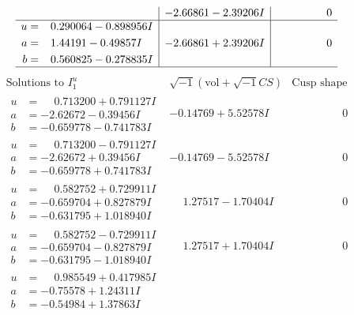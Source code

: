 \documentclass[1p]{elsarticle_modified}
\theoremstyle{definition}
\newcommand{\I}{\sqrt{-1}}
\begin{document}
$$\begin{array}{c|c|c}
 & -2.66861 - 2.39206 I & \phantom{-0.000000 } 0 \\ \hline\begin{aligned}
u &= \phantom{-}0.290064 - 0.898956 I \\
a &= \phantom{-}1.44191 - 0.49857 I \\
b &= \phantom{-}0.560825 - 0.278835 I\end{aligned}
 & -2.66861 + 2.39206 I & \phantom{-0.000000 } 0\\
 \hline 
 \end{array}$$\newpage$$\begin{array}{c|c|c}  
\text{Solutions to }I^u_{1}& \I (\text{vol} + \sqrt{-1}CS) & \text{Cusp shape}\\
 \hline 
\begin{aligned}
u &= \phantom{-}0.713200 + 0.791127 I \\
a &= -2.62672 - 0.39456 I \\
b &= -0.659778 - 0.741783 I\end{aligned}
 & -0.14769 + 5.52578 I & \phantom{-0.000000 } 0 \\ \hline\begin{aligned}
u &= \phantom{-}0.713200 - 0.791127 I \\
a &= -2.62672 + 0.39456 I \\
b &= -0.659778 + 0.741783 I\end{aligned}
 & -0.14769 - 5.52578 I & \phantom{-0.000000 } 0 \\ \hline\begin{aligned}
u &= \phantom{-}0.582752 + 0.729911 I \\
a &= -0.659704 + 0.827879 I \\
b &= -0.631795 + 1.018940 I\end{aligned}
 & \phantom{-}1.27517 - 1.70404 I & \phantom{-0.000000 } 0 \\ \hline\begin{aligned}
u &= \phantom{-}0.582752 - 0.729911 I \\
a &= -0.659704 - 0.827879 I \\
b &= -0.631795 - 1.018940 I\end{aligned}
 & \phantom{-}1.27517 + 1.70404 I & \phantom{-0.000000 } 0 \\ \hline\begin{aligned}
u &= \phantom{-}0.985549 + 0.417985 I \\
a &= -0.75578 + 1.24311 I \\
b &= -0.54984 + 1.37863 I\end{aligned}

\end{array}$$
\end{document}
